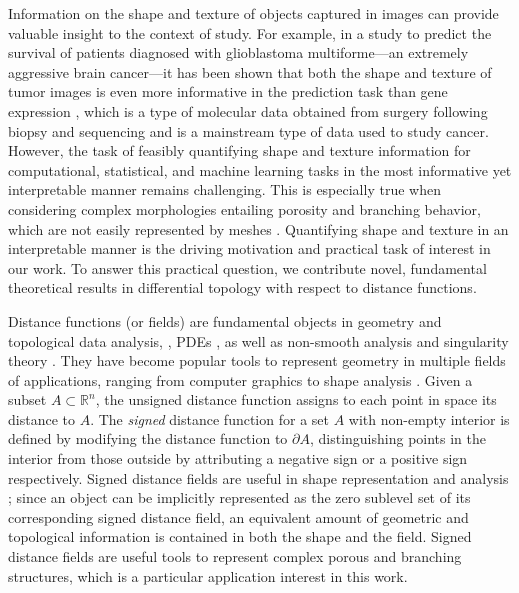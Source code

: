 \documentclass[11pt]{article}
\newcommand{\R}{\mathbb{R}}
\theoremstyle{plain}
\theoremstyle{definition}
\theoremstyle{remark}
\begin{document}
Information on the shape and texture of objects captured in images can provide valuable insight to the context of study.  For example, in a study to predict the survival of patients diagnosed with glioblastoma multiforme---an extremely aggressive brain cancer---it has been shown that both the shape and texture of tumor images is even more informative in the prediction task than gene expression \citep{crawford2020predicting}, which is a type of molecular data obtained from surgery following biopsy and sequencing and is a mainstream type of data used to study cancer.  However, the task of feasibly quantifying shape and texture information for computational, statistical, and machine learning tasks in the most informative yet interpretable manner remains challenging.  This is especially true when considering complex morphologies entailing porosity and branching behavior, which are not easily represented by meshes \citep{song_generation_2021}. Quantifying shape and texture in an interpretable manner is the driving motivation and practical task of interest in our work.  To answer this practical question, we contribute novel, fundamental theoretical results in differential topology with respect to distance functions.

Distance functions (or fields) are fundamental objects in geometry and topological data analysis, \citep{osher_signed_2003, lieutier_any_2003, chazal_stability_2004, attali_stability_2009}, PDEs \citep{albano_singular_2013}, as well as non-smooth analysis and singularity theory \citep{cheeger_critical_1991,birbrair_medial_2017}. 
They have become popular tools to represent geometry in multiple fields of applications, ranging from computer graphics to shape analysis \citep{lee_medial_1982, lindquist_medial_1996, sigg_signed_2003, park_deepsdf_2019}.
Given a subset $A \subset \R^n$, the unsigned distance function assigns to each point in space its distance to $A$. The \emph{signed} distance function for a set $A$ with non-empty interior is defined by modifying the distance function to $\partial A$, distinguishing points in the interior from those outside by attributing a negative sign or a positive sign respectively. Signed distance fields are useful in shape representation and analysis \citep{osher_signed_2003}; since an object can be implicitly represented as the zero sublevel set of its corresponding signed distance field, an equivalent amount of geometric and topological information is contained in both the shape and the field. Signed distance fields are useful tools to represent complex porous and branching structures, which is a particular application interest in this work. 
\end{document}
